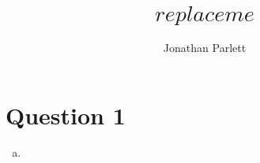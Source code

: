 \documentclass[14pt]{extreport}
\title{$replaceme$}
\author{Jonathan Parlett}
\begin{document}
\maketitle

\section*{Question 1}
\begin{enumerate}[a.]
    \item
\end{enumerate}
\end{document}
